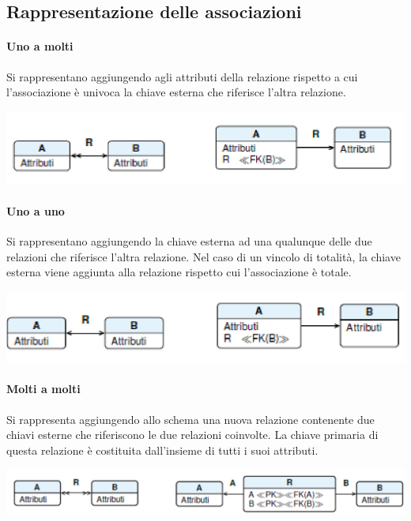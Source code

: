 \documentclass[10pt]{book}
\begin{document}
\subsection{Rappresentazione delle associazioni}
\paragraph{Uno a molti} Si rappresentano aggiungendo agli attributi della relazione rispetto a cui l'associazione è univoca la chiave esterna che riferisce l'altra relazione.
\begin{center}
	\includegraphics[scale=0.25]{ass1n.png}
\end{center}
\paragraph{Uno a uno} Si rappresentano aggiungendo la chiave esterna ad una qualunque delle due relazioni che riferisce l'altra relazione. Nel caso di un vincolo di totalità, la chiave esterna viene aggiunta alla relazione rispetto cui l'associazione è totale.
\begin{center}
	\includegraphics[scale=0.25]{ass11.png}
\end{center}
\paragraph{Molti a molti} Si rappresenta aggiungendo allo schema una nuova relazione contenente due chiavi esterne che riferiscono le due relazioni coinvolte. La chiave primaria di questa relazione è costituita dall'insieme di tutti i suoi attributi.
\begin{center}
	\includegraphics[scale=0.35]{assnn.png}
\end{center}
\end{document}
